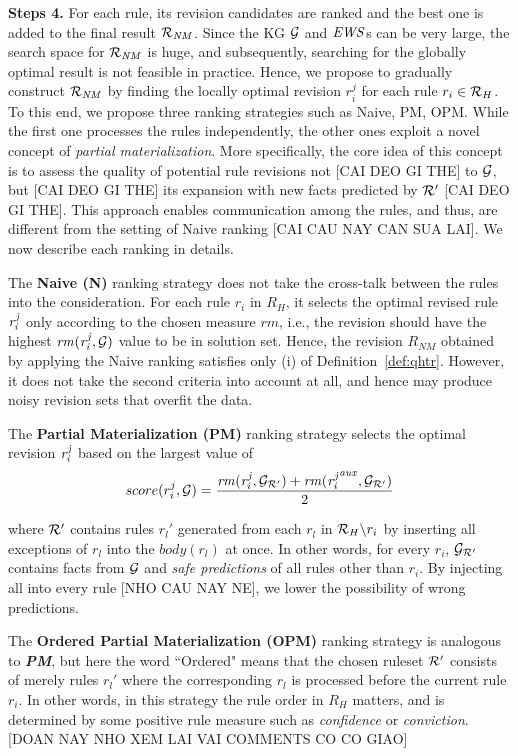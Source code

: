 \smallskip

\noindent \textbf{Steps 4.} For each rule, its revision candidates are ranked and the best one is added to the final result $\mathcal{R}_{\mathit{NM}}$. Since the KG $\mathcal{G}$ and $\mathit{EWS}$s can be very large, the search space for $\mathcal{R}_{\mathit{NM}}$ is huge, and subsequently, searching for the globally optimal result is not feasible in practice. Hence, we propose to gradually construct $\mathcal{R}_{\mathit{NM}}$ by finding the locally optimal revision $r_i^{j}$ for each rule $r_i \in \mathcal{R}_{H}$. To this end, we propose three ranking strategies such as Naive, PM, OPM. While the first one processes the rules independently, the other ones exploit a novel concept of \emph{partial materialization}. More specifically, the core idea of this concept is to assess the quality of potential rule revisions not [CAI DEO GI THE] to $\mathcal{G}$, but [CAI DEO GI THE] its expansion with new facts predicted by $\mathcal{R}'$ [CAI DEO GI THE]. This approach enables communication among the rules, and thus, are different from the setting of Naive ranking [CAI CAU NAY CAN SUA LAI]. We now describe each ranking in details.

The \textbf{Naive (N)} ranking strategy does not take the cross-talk between the rules into the consideration. For each rule $r_i$ in $R_H$, it selects the optimal revised rule $\mathit{r^j_i}$ only according to the chosen measure $rm$, i.e., the revision should have the highest $\mathit{rm(r^j_{i},\mathcal{G})}$ value to be in solution set. Hence, the revision $R_{NM}$ obtained by applying the Naive ranking satisfies only (i) of Definition~\ref{def:qhtr}. However, it does not take the second criteria into account at all, and hence may produce noisy revision sets that overfit the data.

The \textbf{Partial Materialization (PM)} ranking strategy selects the optimal revision $\mathit{r^j_i}$ based on the largest value of
\begin{equation}
\label{pm}
score(r^j_i,\mathcal{G})=\dfrac{\mathit{rm(r^j_i,\mathcal{G}_{\mathcal{R}'})+rm({r^j_i}^{aux},\mathcal{G}_{\mathcal{R}'})}}{2}
\end{equation}

where $\mathcal{R}'$ contains rules $r_l'$ generated from each $r_l$ in $\mathcal{R}_H\backslash r_i$ by inserting all exceptions of $r_l$ into the $body(r_l)$ at once. In other words, for every $r_i$, $\mathcal{G}_{\mathcal{R}'}$ contains facts from $\mathcal{G}$ and \textit{safe predictions} of all rules other than $r_i$. By injecting all into every rule [NHO CAU NAY NE], we lower the possibility of wrong predictions.

The \textbf{Ordered Partial Materialization (OPM)} ranking strategy is analogous to \textbf{\emph{PM}}, but here the word ``Ordered" means that the chosen ruleset $\mathcal{R}'$ consists of merely rules $r_l'$ where the corresponding $r_l$ is processed before the current rule $r_i$. In other words, in this strategy the rule order in $R_H$ matters, and is determined by some positive rule measure such as \textit{confidence} or \textit{conviction}. [DOAN NAY NHO XEM LAI VAI COMMENTS CO CO GIAO]